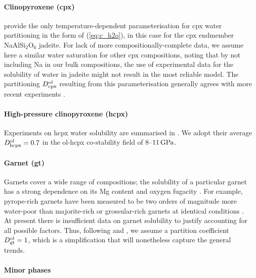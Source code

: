 \paragraph{Clinopyroxene (cpx)}

\citet{bromiley_experimental_2004} provide the only temperature-dependent parameterisation for cpx water partitioning in the form of (\ref{eq:c_h2o}), in this case for the cpx endmember NaAlSi$_2$O$_6$ jadeite. For lack of more compositionally-complete data, we assume here a similar water saturation for other cpx compositions, noting that by not including Na in our bulk compositions, the use of experimental data for the solubility of water in jadeite might not result in the most reliable model. The partitioning $D^{\rm ol}_{\rm cpx}$ resulting from this parameterisation generally agrees with more recent experiments \citep{kovacs_experimental_2012, demouchy_subsolidus_2017, padron-navarta_subsolidus_2017}.

\paragraph{High-pressure clinopyroxene (hcpx)}

Experiments on hcpx water solubility are summarised in \citet{withers_h2o_2007}. We adopt their average $D^{\rm ol}_{\rm hcpx} = 0.7$ in the ol-hcpx co-stability field of 8--$11\,{\rm GPa}$. 

\paragraph{Garnet (gt)}

Garnets cover a wide range of compositions; the solubility of a particular garnet has a strong dependence on its Mg content and oxygen fugacity \citep[e.g.,][]{mookherjee_solubility_2010, zhang_effects_2022}. For example, pyrope-rich garnets have been measured to be two orders of magnitude more water-poor than majorite-rich or grossular-rich garnets at identical conditions \citep{zhang_effects_2022}. At present there is insufficient data on garnet solubility to justify accounting for all possible factors. Thus, following \citet{demouchy_distribution_2016} and \citet{andrault_mantle_2022}, we assume a partition coefficient $D^{\rm ol}_{\rm gt} = 1$, which is a simplification that will nonetheless capture the general trends.

\paragraph{Minor phases}

